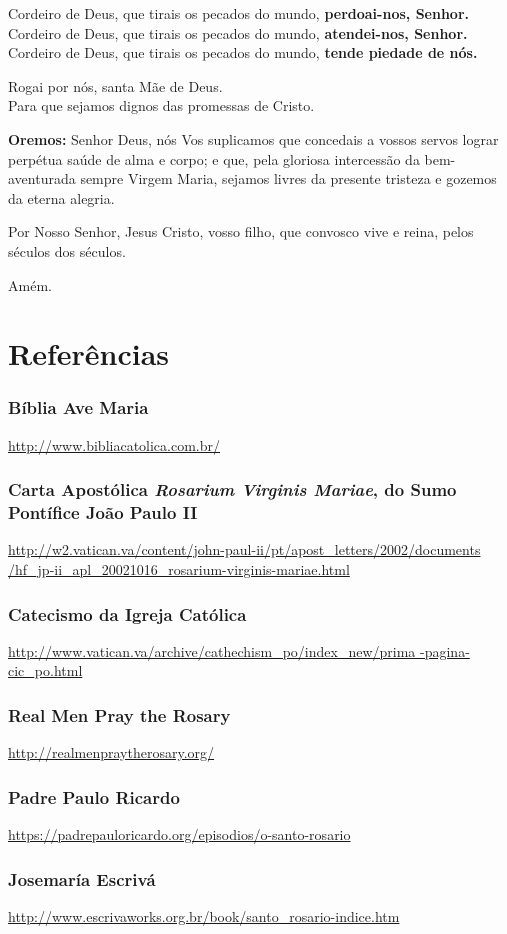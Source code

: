 \documentclass[10pt,a5paper]{book}
\newcommand{\from}[1]{\subsection*{#1}}
\begin{document}
Cordeiro de Deus, que tirais os pecados do mundo, \textbf{perdoai-nos, Senhor.} \\
Cordeiro de Deus, que tirais os pecados do mundo, \textbf{atendei-nos, Senhor.} \\
Cordeiro de Deus, que tirais os pecados do mundo, \textbf{tende piedade de nós.}

Rogai por nós, santa Mãe de Deus. \\
Para que sejamos dignos das promessas de Cristo.

\textbf{Oremos:}
Senhor Deus, nós Vos suplicamos que concedais a vossos servos lograr perpétua saúde de alma e corpo; e que, pela gloriosa intercessão da bem-aventurada sempre Virgem Maria, sejamos livres da presente tristeza e gozemos da eterna alegria.

Por Nosso Senhor, Jesus Cristo, vosso filho, que convosco vive e reina, pelos séculos dos séculos.

Amém.


\chapter{Referências}

\from{Bíblia Ave Maria}

\url{http://www.bibliacatolica.com.br/}

\from{Carta Apostólica \emph{Rosarium Virginis Mariae}, do Sumo Pontífice João Paulo II}

\url{http://w2.vatican.va/content/john-paul-ii/pt/apost_letters/2002/documents
/hf_jp-ii_apl_20021016_rosarium-virginis-mariae.html}

\from{Catecismo da Igreja Católica}

\url{http://www.vatican.va/archive/cathechism_po/index_new/prima
-pagina-cic_po.html}

\from{Real Men Pray the Rosary}

\url{http://realmenpraytherosary.org/}

\from{Padre Paulo Ricardo}

\url{https://padrepauloricardo.org/episodios/o-santo-rosario}

\from{Josemaría Escrivá}

\url{http://www.escrivaworks.org.br/book/santo_rosario-indice.htm}

\end{document}
